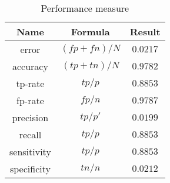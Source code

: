 \begin{table}
    \centering
    \begin{tabular}{|c|c|c|}\hline
    Name        & Formula       &   Result      \\\hline
    error       & $(fp+fn)/N$   &   $0.0217$    \\
    accuracy    & $(tp+tn)/N$   &   $0.9782$    \\\hline
    tp-rate     & $tp/p$        &   $0.8853$    \\
    fp-rate     & $fp/n$        &   $0.9787$    \\\hline
    precision   & $tp/p'$       &   $0.0199$    \\
    recall      & $tp/p$        &   $0.8853$    \\\hline
    sensitivity & $tp/p$        &   $0.8853$    \\
    specificity & $tn/n$        &   $0.0212$    \\\hline
    \end{tabular}
    \caption{Performance measure}
    \label{tab:performance}
\end{table}